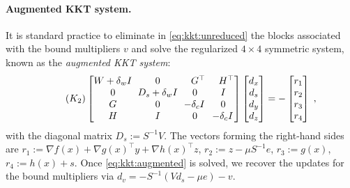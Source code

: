 \paragraph{Augmented KKT system.}
It is standard practice to eliminate in \eqref{eq:kkt:unreduced} the blocks associated
with the bound multipliers $v$ and solve the regularized
$4 \times 4$ symmetric system, known as the \emph{augmented KKT system}:
\begin{equation}
  \label{eq:kkt:augmented}
  \tag{$K_2$}
  \setlength\arraycolsep{3pt}
  \begin{bmatrix}
    W + \delta_w I & 0   & \phantom{-}G^\top           & \phantom{-}H^\top           \\
      0       & D_s + \delta_w I  & \phantom{-}0\phantom{^\top} & \phantom{-}I\phantom{^\top} \\
      G       & 0   & -\delta_c I  & \phantom{-}0\phantom{^\top} \\
    H       & I   & \phantom{-}0\phantom{^\top} & -\delta_c I
  \end{bmatrix}
  \begin{bmatrix}
    d_x \\
    d_s \\
    d_y \\
    d_z
  \end{bmatrix}
  = - \begin{bmatrix}
    r_1 \\ r_2 \\ r_3 \\ r_4
  \end{bmatrix} \; ,
\end{equation}
with the diagonal matrix $D_s := S^{-1} V$.
The vectors forming the right-hand sides are
$r_1 := \nabla f(x) + \nabla g(x)^\top y + \nabla h(x)^\top z$,
$r_2 := z - \mu S^{-1} e$,
$r_3 := g(x)$,
$r_4 := h(x) + s$.
Once \eqref{eq:kkt:augmented} is solved, we recover the updates for the bound multipliers via
$d_v = - S^{-1}(V d_s - \mu e) - v$.

